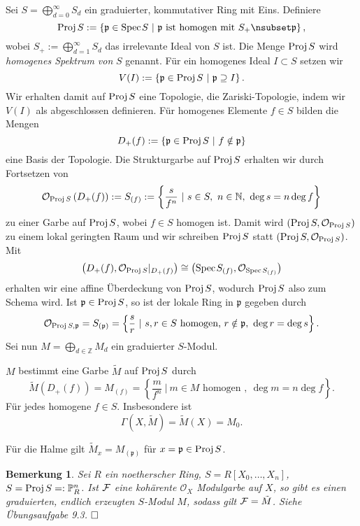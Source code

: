 \documentclass[11pt]{book}
\newtheorem{remark}[theorem]{Bemerkung}
\theoremstyle{nonumberbreak}
\newenvironment{pr}[1][]{\ifthenelse{\equal{#1}{}}{\proof}{\proof[#1]}\rm}{\endproof}
\newenvironment{erinnbem}[1][]{\ifthenelse{\equal{#1}{}}{\erinnbemer}{\erinnbemer[#1]}\rm}{\enderinnbemer}
\newcommand{\spec}{\mathrm{Spec} \hspace{1pt} }
\newcommand{\p}{\mathfrak{p}}
\newcommand{\Proj}{\mathrm{Proj} \hspace{1.5pt}}
\begin{document}
\begin{spacing}{1.4}
\begin{erinnbem}    %
Sei $S= \bigoplus_{d=0}^{\infty}S_d$ ein graduierter, kommutativer Ring mit Eins. Definiere
$$\Proj S :=  \left\{ \p \in \spec S \ \vert \ \p \textrm{ ist homogen mit } S_+ \nsubset \p \right\},$$
wobei $S_+:= \bigoplus_{d=1}^{\infty} S_d$ das irrelevante Ideal von $S$ ist. Die Menge $\Proj S$ wird \textit{homogenes Spektrum von} $S$ genannt. Für ein homogenes Ideal $I \subset S$ setzen wir
$$V(I) := \left\{ \p \in \Proj S \ \vert \ \p \supseteq I \right\}.$$
Wir erhalten damit auf $\Proj S$ eine Topologie, die Zariski-Topologie, indem wir $V(I)$ als abgeschlossen definieren. Für homogenes Elemente $f \in S$ bilden die Mengen 
$$D_+(f) := \left\{ \p \in \Proj S \ \vert \ f \notin \p \right\}$$
eine Basis der Topologie. Die Strukturgarbe auf $\Proj S$ erhalten wir durch Fortsetzen von 
$$\mathcal{O}_{\Proj S}\left(D_+(f)\right) := S_{(f)} := \left\{ \frac{s}{f^n} \ \vert \ s \in S,\ n \in \mathbb{N}, \ \deg s = n \deg f \right\} $$
zu einer Garbe auf $\Proj S$, wobei $f \in S$ homogen ist. Damit wird $(\Proj S, \mathcal{O}_{\Proj S})$ zu einem lokal geringten Raum und wir schreiben $\Proj S$ statt $(\Proj S, \mathcal{O}_{\Proj S})$. Mit
$$\left( D_+(f), \mathcal{O}_{\Proj S} \vert_{D_+(f)} \right) \cong \left( \spec S_{(f)}, \mathcal{O}_{\spec S_{(f)}} \right)$$
erhalten wir eine affine Überdeckung von $\Proj S$, wodurch $\Proj S$ also zum Schema wird. Ist $\p \in \Proj S$, so ist der lokale Ring in $\p$ gegeben durch 
$$\mathcal{O}_{\Proj S, \p} = S_{(\p)} = \left\{ \frac{s}{r} \ \vert \ s,r \in S \textrm{ homogen, } r \notin \p, \ \deg r = \deg s \right\}.$$
Sei nun $M= \bigoplus_{d \in \mathbb{Z}} M_d$ ein graduierter $S$-Modul.
\begin{compactenum}
\item $M$ bestimmt eine Garbe $\tilde{M}$ auf $\Proj S$ durch 
$$\tilde{M}(D_+(f)) = M_{(f)} = \left\{ \frac{m}{f^n} \ \vert \ m \in M \textrm{ homogen }, \ \deg m = n \deg f \right\}.$$
Für jedes homogene $f \in S$. Insbesondere ist 
$$\Gamma(X, \tilde{M}) = \tilde{M}(X) = M_0.$$
\item Für die Halme gilt $\tilde{M}_x = M_{(\p)}$ für $x=\p \in \Proj S$.

\end{compactenum}
\end{erinnbem}


\begin{remark}   %
Sei $R$ ein noetherscher Ring, $S=R[X_0, \ldots, X_n]$, $S= \Proj S =: \Pro^n_R$. Ist $\mathcal{F}$ eine kohärente $\mathcal{O}_X$ Modulgarbe auf $X$, so gibt es einen graduierten, endlich erzeugten $S$-Modul $M$, sodass gilt $\mathcal{F}=\tilde{M}$.
\begin{pr}
Siehe Übungsaufgabe 9.3. $\hfill \Box$
\end{pr}


\end{remark}
\end{spacing}
\end{document}
